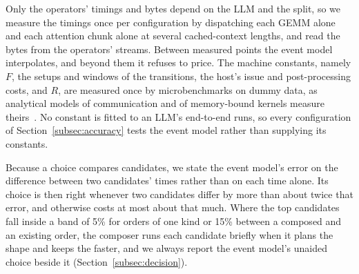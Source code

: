 Only the operators' timings and bytes depend on the LLM and the split, so we measure the timings once per configuration by dispatching each GEMM alone and each attention chunk alone at several cached-context lengths, and read the bytes from the operators' streams.
Between measured points the event model interpolates, and beyond them it refuses to price.
The machine constants, namely $F$, the setups and windows of the transitions, the host's issue and post-processing costs, and $R$, are measured once by microbenchmarks on dummy data, as analytical models of communication and of memory-bound kernels measure theirs~.
No constant is fitted to an LLM's end-to-end runs, so every configuration of Section~\ref{subsec:accuracy} tests the event model rather than supplying its constants.

Because a choice compares candidates, we state the event model's error on the difference between two candidates' times rather than on each time alone.
Its choice is then right whenever two candidates differ by more than about twice that error, and otherwise costs at most about that much.
Where the top candidates fall inside a band of 5\% for orders of one kind or 15\% between a composed and an existing order, the composer runs each candidate briefly when it plans the shape and keeps the faster, and we always report the event model's unaided choice beside it (Section~\ref{subsec:decision}).
